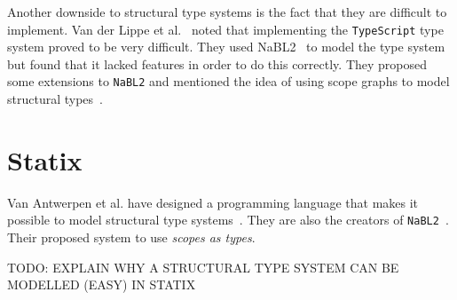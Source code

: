 \documentclass{article}
\newcommand{\ttt}[1]{\texttt{#1}}
\begin{document}
Another downside to structural type systems is the fact that they are difficult to implement.
Van der Lippe et al.~\cite{MetaTypeScript} noted that implementing the \ttt{TypeScript} type system proved to be very difficult.
They used NaBL2~\cite{nabl2} to model the type system but found that it lacked features in order to do this correctly.
They proposed some extensions to \ttt{NaBL2} and mentioned the idea of using scope graphs to model structural types~\cite{MetaTypeScript}.

\section*{Statix}
Van Antwerpen et al. have designed a programming language that makes it possible to model structural type systems~\cite{Statix}.
They are also the creators of \ttt{NaBL2}~\cite{nabl2}.
Their proposed system to use \textit{scopes as types}.

TODO: EXPLAIN WHY A STRUCTURAL TYPE SYSTEM CAN BE MODELLED (EASY) IN STATIX
\end{document}
